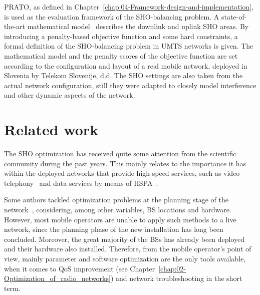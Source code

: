 \bigskip{}


PRATO, as defined in Chapter~\ref{chap:04-Framework-design-and-implementation},
is used as the evaluation framework of the SHO-balancing problem.
A state-of-the-art mathematical model~\cite{Nawrocki-Understanding_UMTS_radio_network_modelling_and_optimisation:2006}
describes the downlink and uplink SHO areas. By introducing a penalty-based
objective function and some hard constraints, a formal definition
of the SHO-balancing problem in UMTS networks is given. The mathematical
model and the penalty scores of the objective function are set according
to the configuration and layout of a real mobile network, deployed
in Slovenia by Telekom Slovenije, d.d. The SHO settings are also taken
from the actual network configuration, still they were adapted to
closely model interference and other dynamic aspects of the network.


\section{Related work \label{sec:07-Related-work}}

The SHO optimization has received quite some attention from the scientific
community during the past years. This mainly relates to the importance
it has within the deployed networks that provide high-speed services,
such as video telephony~\cite{chen2010_impact_of_soft_handover}
and data services by means of HSPA~\cite{chen2008cpich,chen2011_coverage_planning_for_optimizing_HSDPA}.

Some authors tackled optimization problems at the planning stage of
the network~\cite{Eisenblatter_OptimizationMethodsForUMTSRadioNetworkPlanning,ghosh2011_optimising_CDMA_cell_planning},
considering, among other variables, BS locations and hardware. However,
most mobile operators are unable to apply such methods to a live network,
since the planning phase of the new installation has long been concluded.
Moreover, the great majority of the BSs has already been deployed
and their hardware also installed. Therefore, from the mobile operator's
point of view, mainly parameter and software optimization are the
only tools available, when it comes to QoS improvement (see Chapter~\ref{chap:02-Optimization_of_radio_networks})
and network troubleshooting in the short term.

